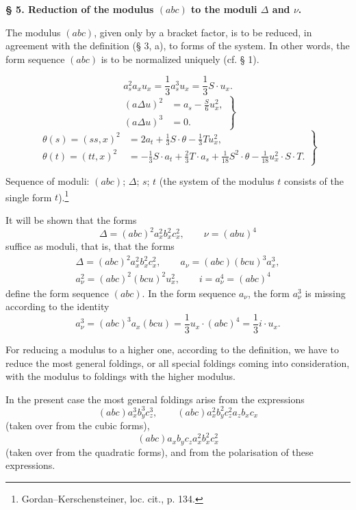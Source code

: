 \documentclass[11pt]{article}
\newcommand{\A}{\Delta}
\begin{document}
\begin{center}
\textbf{§ 5. \quad Reduction of the modulus $(abc)$ to the moduli $\A$ and $\nu$.}
\end{center}

The modulus $(abc)$, given only by a bracket factor, is to be reduced, in agreement with the definition (§ 3, a), to forms of the system. In other words, the form sequence $(abc)$ is to be normalized uniquely (cf. § 1).

\[
a_s^2a_xu_x=\frac13 a_s^3u_x=\frac13 S\cdot u_x. \tag{2}
\]
\[
\left.
\begin{aligned}
(a\A u)^2&=a_s-\frac{S}{6}u_x^2,\\
(a\A u)^3&=0.
\end{aligned}
\right\} \tag{3}
\]
\[
\left.
\begin{aligned}
\theta(s)=(ss,x)^2&=2a_t+\frac13 S\cdot\theta-\frac13 Tu_x^2,\\
\theta(t)=(tt,x)^2&=-\frac13 S\cdot a_t+\frac23 T\cdot a_s+\frac1{18}S^2\cdot\theta-\frac1{18}u_x^2\cdot S\cdot T.
\end{aligned}
\right\} \tag{4}
\]

Sequence of moduli: $(abc)$; $\A$; $s$; $t$ (the system of the modulus $t$ consists of the single form $t$).\footnote{Gordan--Kerschensteiner, loc. cit., p. 134.}

It will be shown that the forms
\[
\A=(abc)^2a_x^2b_x^2c_x^2,\qquad \nu=(abu)^4
\]
suffice as moduli, that is, that the forms
\[
\begin{gathered}
\A=(abc)^2a_x^2b_x^2c_x^2,\qquad
a_\nu=(abc)(bcu)^3a_x^3,\\
a_\nu^2=(abc)^2(bcu)^2u_x^2,\qquad
i=a_\nu^4=(abc)^4
\end{gathered}
\]
define the form sequence $(abc)$. In the form sequence $a_\nu$, the form $a_\nu^3$ is missing according to the identity
\[
a_\nu^3=(abc)^3a_x(bcu)=\frac13 u_x\cdot(abc)^4=\frac13 i\cdot u_x.
\]

For reducing a modulus to a higher one, according to the definition, we have to reduce the most general foldings, or all special foldings coming into consideration, with the modulus to foldings with the higher modulus.

In the present case the most general foldings arise from the expressions
\[
(abc)a_x^3b_y^3c_z^3,\qquad
(abc)a_x^2b_y^2c_z^2a_zb_xc_x
\]
(taken over from the cubic forms),
\[
(abc)a_xb_yc_za_x^2b_x^2c_x^2
\]
(taken over from the quadratic forms), and from the polarisation of these expressions.
\end{document}
